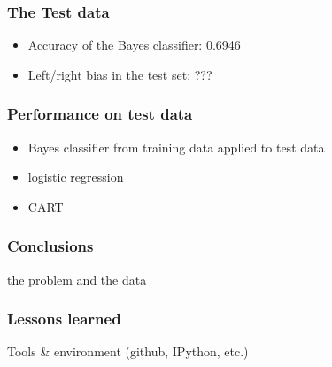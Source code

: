 \documentclass[fleqn]{beamer}
\begin{document}
\begin{frame}
\frametitle{The Test data}
    \begin{itemize}
        \item Accuracy of the Bayes classifier: 0.6946
        \item Left/right bias in the test set: ???
    \end{itemize}

\end{frame}

\begin{frame}
\frametitle{Performance on test data}
    \begin{itemize}
        \item Bayes classifier from training data applied to test data
        \item logistic regression
        \item CART
    \end{itemize}

\end{frame}

\begin{frame}
\frametitle{Conclusions}
    the problem and the data

\end{frame}

\begin{frame}
\frametitle{Lessons learned}
   Tools \& environment (github, IPython, etc.)


\end{frame}
\end{document}
